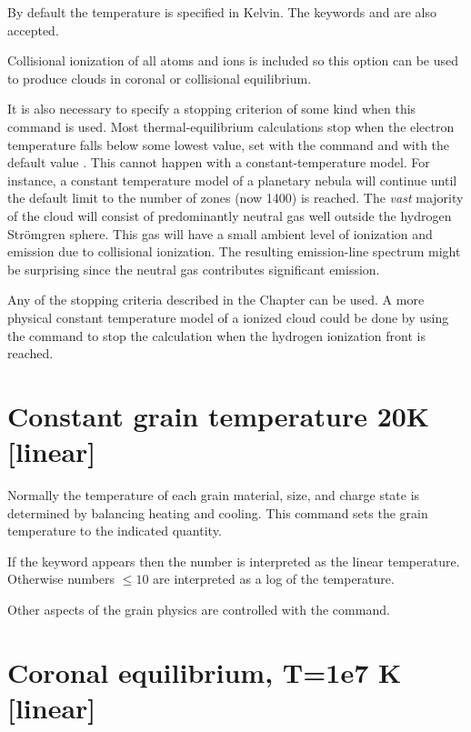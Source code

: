 By default the temperature is specified in Kelvin.
The keywords 
and  are also accepted.

Collisional ionization of all atoms and ions is included so this option
can be used to produce clouds in coronal or collisional equilibrium.

  It is also necessary to specify a
stopping criterion of some
kind when this command is used.
Most thermal-equilibrium calculations stop
when the electron temperature falls below some lowest value, set with the
 command and with the default
value \TEMPSTOPDEFAULT.
This cannot happen with a constant-temperature model.
For
instance, a constant temperature model of a planetary nebula will
continue
until the default limit to the number of zones (now 1400) is reached.
The
\emph{vast} majority of the cloud will consist of predominantly
neutral gas well outside the hydrogen Str\"omgren sphere.
This gas will have a small ambient
level of ionization and emission due to collisional ionization.
The
resulting emission-line spectrum might be surprising since the neutral gas
contributes significant emission.

Any of the stopping criteria described in the
Chapter  can be used.
A more physical constant
temperature model of a ionized cloud could be done by using the
 command to stop the calculation when the hydrogen
ionization front is reached.

\section{Constant grain temperature 20K [linear]}

Normally the temperature of each grain material, size, and charge state is determined
by balancing heating and cooling.  This command sets the grain temperature
to the indicated quantity.

If the  keyword appears then the number
is interpreted as the linear temperature.
Otherwise numbers $\le 10$ are interpreted as a log
of the temperature.

Other aspects of the grain physics are controlled with the
 command.

\section{Coronal equilibrium, T=1e7 K [linear]}
\label{sec:CommandCoronalEquilibrium}

